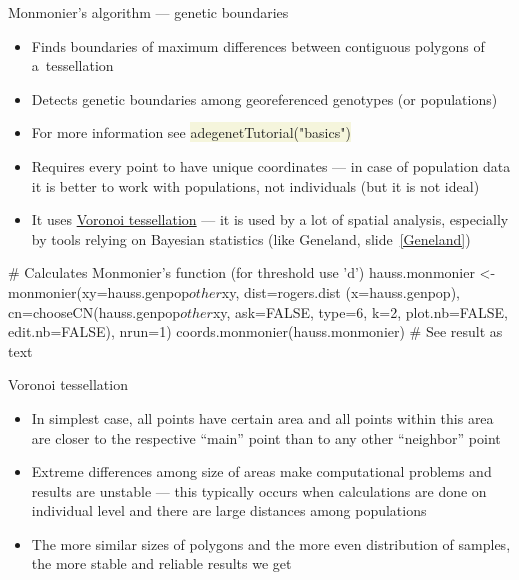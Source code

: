 \documentclass[compress, xelatex, 11pt, xcolor=svgnames, aspectratio=169,
	hyperref={
		bookmarks=true,
		unicode=true,
		colorlinks=true,
		pdftitle={Molecular data in R},
		plainpages=false,
		pdfauthor={Vojtech Zeisek},
		pdfsubject={Course about phylogeny and evolution in R},
		pdfcreator={XeLaTeX},
		pdfkeywords={R, evolution, phylogeny, molecular data},
		linkcolor=Crimson, %
		anchorcolor=Magenta, %
		citecolor=Magenta, %
		filecolor=Magenta, %
		menucolor=Magenta, %
		urlcolor=DodgerBlue, %
		},
	url={hyphens, lowtilde} %
	]{beamer}
\renewcommand{\texttt}[1]{\colorbox{Beige}{{\ttfamily #1}}}
\begin{document}
\begin{frame}[fragile]{Monmonier's algorithm --- genetic boundaries}
	\begin{itemize}
		\item Finds boundaries of maximum differences between contiguous polygons of a~tessellation
		\item Detects genetic boundaries among georeferenced genotypes (or populations)
		\item For more information see \texttt{adegenetTutorial("basics")}
		\item Requires every point to have unique coordinates --- in case of population data it is better to work with populations, not individuals (but it is not ideal)
		\item It uses \href{https://en.wikipedia.org/wiki/Voronoi_diagram}{Voronoi tessellation} --- it is used by a lot of spatial analysis, especially by tools relying on Bayesian statistics (like Geneland, slide~\ref{Geneland})
	\end{itemize}
	\begin{spluscode}
    # Calculates Monmonier's function (for threshold use 'd')
    hauss.monmonier <- monmonier(xy=hauss.genpop$other$xy, dist=rogers.dist
      (x=hauss.genpop), cn=chooseCN(hauss.genpop$other$xy, ask=FALSE, type=6,
      k=2, plot.nb=FALSE, edit.nb=FALSE), nrun=1)
    coords.monmonier(hauss.monmonier) # See result as text
	\end{spluscode}
\end{frame}

\begin{frame}{Voronoi tessellation}
	\begin{multicols}{2}
		\begin{center}
			\texttt{[image: voronoi\_diagram.png]}
		\end{center}
		\begin{itemize}
			\item In simplest case, all points have certain area and all points within this area are closer to the respective \enquote{main} point than to any other \enquote{neighbor} point
			\item Extreme differences among size of areas make computational problems and results are unstable --- this typically occurs when calculations are done on individual level and there are large distances among populations
			\item The more similar sizes of polygons and the more even distribution of samples, the more stable and reliable results we get
		\end{itemize}
	\end{multicols}
\end{frame}
\end{document}
